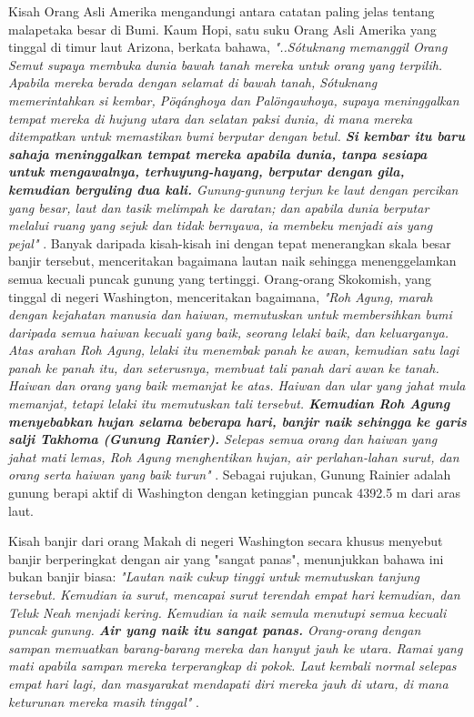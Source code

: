 \documentclass[10pt,twocolumn,letterpaper]{article}
\begin{document}
Kisah Orang Asli Amerika mengandungi antara catatan paling jelas tentang malapetaka besar di Bumi. Kaum Hopi, satu suku Orang Asli Amerika yang tinggal di timur laut Arizona, berkata bahawa, \textit{"..Sótuknang memanggil Orang Semut supaya membuka dunia bawah tanah mereka untuk orang yang terpilih. Apabila mereka berada dengan selamat di bawah tanah, Sótuknang memerintahkan si kembar, Pöqánghoya dan Palöngawhoya, supaya meninggalkan tempat mereka di hujung utara dan selatan paksi dunia, di mana mereka ditempatkan untuk memastikan bumi berputar dengan betul. \textbf{Si kembar itu baru sahaja meninggalkan tempat mereka apabila dunia, tanpa sesiapa untuk mengawalnya, terhuyung-hayang, berputar dengan gila, kemudian berguling dua kali.} Gunung-gunung terjun ke laut dengan percikan yang besar, laut dan tasik melimpah ke daratan; dan apabila dunia berputar melalui ruang yang sejuk dan tidak bernyawa, ia membeku menjadi ais yang pejal"} \cite{4}.
Banyak daripada kisah-kisah ini dengan tepat menerangkan skala besar banjir tersebut, menceritakan bagaimana lautan naik sehingga menenggelamkan semua kecuali puncak gunung yang tertinggi. Orang-orang Skokomish, yang tinggal di negeri Washington, menceritakan bagaimana, \textit{"Roh Agung, marah dengan kejahatan manusia dan haiwan, memutuskan untuk membersihkan bumi daripada semua haiwan kecuali yang baik, seorang lelaki baik, dan keluarganya. Atas arahan Roh Agung, lelaki itu menembak panah ke awan, kemudian satu lagi panah ke panah itu, dan seterusnya, membuat tali panah dari awan ke tanah. Haiwan dan orang yang baik memanjat ke atas. Haiwan dan ular yang jahat mula memanjat, tetapi lelaki itu memutuskan tali tersebut. \textbf{Kemudian Roh Agung menyebabkan hujan selama beberapa hari, banjir naik sehingga ke garis salji Takhoma (Gunung Ranier).} Selepas semua orang dan haiwan yang jahat mati lemas, Roh Agung menghentikan hujan, air perlahan-lahan surut, dan orang serta haiwan yang baik turun"} \cite{3}. Sebagai rujukan, Gunung Rainier adalah gunung berapi aktif di Washington dengan ketinggian puncak 4392.5 m dari aras laut.

Kisah banjir dari orang Makah di negeri Washington secara khusus menyebut banjir berperingkat dengan air yang "sangat panas", menunjukkan bahawa ini bukan banjir biasa: \textit{"Lautan naik cukup tinggi untuk memutuskan tanjung tersebut. Kemudian ia surut, mencapai surut terendah empat hari kemudian, dan Teluk Neah menjadi kering. Kemudian ia naik semula menutupi semua kecuali puncak gunung. \textbf{Air yang naik itu sangat panas.} Orang-orang dengan sampan memuatkan barang-barang mereka dan hanyut jauh ke utara. Ramai yang mati apabila sampan mereka terperangkap di pokok. Laut kembali normal selepas empat hari lagi, dan masyarakat mendapati diri mereka jauh di utara, di mana keturunan mereka masih tinggal"} \cite{3}.
\end{document}
